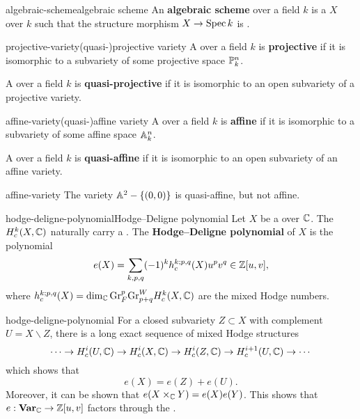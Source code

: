 \begin{topic}{algebraic-scheme}{algebraic scheme}
    An \textbf{algebraic scheme} over a field $k$ is a  $X$ over $k$ such that the structure morphism $X \to \Spec k$ is .
\end{topic}

\begin{topic}{projective-variety}{(quasi-)projective variety}
    A  over a field $k$ is \textbf{projective} if it is isomorphic to a  subvariety of some projective space $\PP^n_k$.
    
    A  over a field $k$ is \textbf{quasi-projective} if it is isomorphic to an open subvariety of a projective variety.
\end{topic}

\begin{topic}{affine-variety}{(quasi-)affine variety}
    A  over a field $k$ is \textbf{affine} if it is isomorphic to a  subvariety of some affine space $\AA^n_k$.
    
    A  over a field $k$ is \textbf{quasi-affine} if it is isomorphic to an open subvariety of an affine variety.
\end{topic}

\begin{example}{affine-variety}
    The variety $\AA^2 - \{ (0, 0) \}$ is quasi-affine, but not affine.
\end{example}

\begin{topic}{hodge-deligne-polynomial}{Hodge--Deligne polynomial}
    Let $X$ be a  over $\CC$. The  $H_c^k(X, \CC)$ naturally carry a . The \textbf{Hodge--Deligne polynomial} of $X$ is the polynomial
    \[ e(X) = \sum_{k, p, q} (-1)^k h_c^{k; p, q}(X) u^p v^q \in \ZZ[u, v] , \]
    where $h_c^{k; p, q}(X) = \dim_\CC \textup{Gr}_F^p \textup{Gr}^W_{p + q} H_c^k(X, \CC)$ are the mixed Hodge numbers.
\end{topic}

\begin{example}{hodge-deligne-polynomial}
    For a closed subvariety $Z \subset X$ with complement $U = X \backslash Z$, there is a long exact sequence of mixed Hodge structures
    \[ \cdots \to H_c^i(U, \CC) \to H_c^i(X, \CC) \to H_c^i(Z, \CC) \to H_c^{i + 1}(U, \CC) \to \cdots \]
    which shows that
    \[ e(X) = e(Z) + e(U) . \]
    Moreover, it can be shown that $e(X \times_\CC Y) = e(X) e(Y)$. This shows that $e : \textbf{Var}_\CC \to \ZZ[u, v]$ factors through the .
\end{example}

